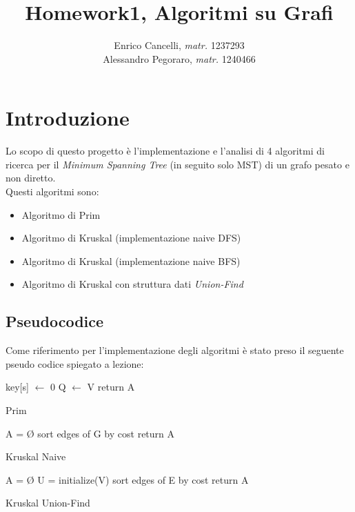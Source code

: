 \documentclass[]{article}
\title{Homework1, Algoritmi su Grafi}
\author{Enrico Cancelli, \textit{matr.} 1237293\\
		Alessandro Pegoraro, \textit{matr.} 1240466}
\begin{document}
\maketitle \medskip

\section{Introduzione}
Lo scopo di questo progetto è l'implementazione e l'analisi di 4 algoritmi di ricerca per il \textit{Minimum Spanning Tree} (in seguito solo MST) di un grafo pesato e non diretto.\\
Questi algoritmi sono:
\begin{itemize}
	\item Algoritmo di Prim
	\item Algoritmo di Kruskal (implementazione naive DFS)
	\item Algoritmo di Kruskal (implementazione naive BFS)
	\item Algoritmo di Kruskal con struttura dati \textit{Union-Find}
\end{itemize}
\subsection{Pseudocodice}
Come riferimento per l'implementazione degli algoritmi è stato preso il seguente pseudo codice spiegato a lezione:\\
\begin{algorithm}[H]
	\SetAlgoLined
	\DontPrintSemicolon
	key[s] $\gets$ 0\;
	Q $\gets$ V\;
	return A\;
	\caption{Prim}
\end{algorithm}

\begin{algorithm}[H]
	\SetAlgoLined
	\DontPrintSemicolon
	A = Ø\;
	sort edges of G by cost\;
	return A\;
	\caption{Kruskal Naive}
\end{algorithm}

\begin{algorithm}[H]
	\SetAlgoLined
	\DontPrintSemicolon
	A = Ø\;
	U = initialize(V)\;
	sort edges of E by cost\;
	return A\;
	\caption{Kruskal Union-Find}
\end{algorithm}
\end{document}
